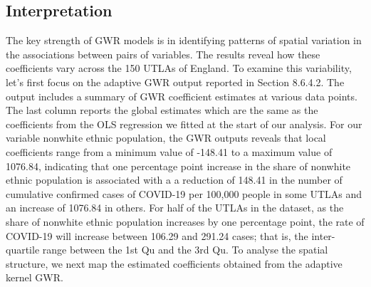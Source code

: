 \documentclass[
  letterpaper,
  krantz2]{style/krantz}
\begin{document}
\hypertarget{interpretation-1}{%
\subsection{Interpretation}\label{interpretation-1}}

The key strength of GWR models is in identifying patterns of spatial
variation in the associations between pairs of variables. The results
reveal how these coefficients vary across the 150 UTLAs of England. To
examine this variability, let's first focus on the adaptive GWR output
reported in Section 8.6.4.2. The output includes a summary of GWR
coefficient estimates at various data points. The last column reports
the global estimates which are the same as the coefficients from the OLS
regression we fitted at the start of our analysis. For our variable
nonwhite ethnic population, the GWR outputs reveals that local
coefficients range from a minimum value of -148.41 to a maximum value of
1076.84, indicating that one percentage point increase in the share of
nonwhite ethnic population is associated with a a reduction of 148.41 in
the number of cumulative confirmed cases of COVID-19 per 100,000 people
in some UTLAs and an increase of 1076.84 in others. For half of the
UTLAs in the dataset, as the share of nonwhite ethnic population
increases by one percentage point, the rate of COVID-19 will increase
between 106.29 and 291.24 cases; that is, the inter-quartile range
between the 1st Qu and the 3rd Qu. To analyse the spatial structure, we
next map the estimated coefficients obtained from the adaptive kernel
GWR.
\end{document}
